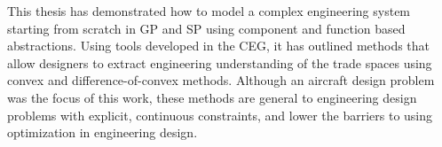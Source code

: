 This thesis has demonstrated how to model a complex engineering system
starting from scratch in \gls{GP} and \gls{SP} using
component and function based abstractions. Using tools developed in the \gls{CEG},
it has outlined methods that allow designers to extract engineering understanding of
the trade spaces using convex and difference-of-convex methods.
Although an aircraft design problem was the focus of this work,
these methods are general to engineering design problems with explicit, continuous constraints,
and lower the barriers to using optimization in engineering design.


